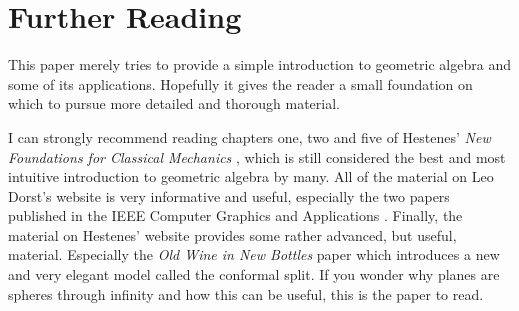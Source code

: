 \documentclass[10pt]{report}
\begin{document}
\section{Further Reading}

This paper merely tries to provide a simple introduction to
geometric algebra and some of its applications. Hopefully it gives
the reader a small foundation on which to pursue more detailed and
thorough material.

I can strongly recommend reading chapters one, two and five of
Hestenes' \emph{New Foundations for Classical Mechanics}
\cite{bib:hestenes new foundations}, which is still considered the
best and most intuitive introduction to geometric algebra by many.
All of the material on Leo Dorst's website \cite{bib:dorst
website} is very informative and useful, especially the two papers
published in the IEEE Computer Graphics and Applications
\cite{bib:dorst part 1} \cite{bib:dorst part 2}. Finally, the
material on Hestenes' website \cite{bib:hestenes website} provides
some rather advanced, but useful, material. Especially the
\emph{Old Wine in New Bottles} paper which introduces a new and
very elegant model called the conformal split. If you wonder why
planes are spheres through infinity and how this can be useful,
this \cite{bib:hestenes old wine} is the paper to read.
\end{document}
